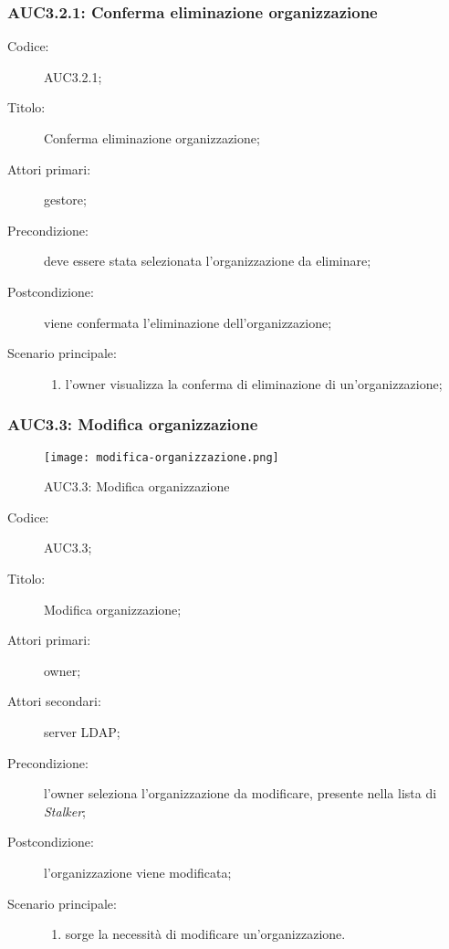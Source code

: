\documentclass[../../../analisi-dei-requisiti.tex]{subfiles}
\begin{document}
\subsubsection{AUC3.2.1: Conferma eliminazione organizzazione}%
\label{subs:AUC3.2.1}
\begin{description}
  \item[Codice:] AUC3.2.1;
  \item[Titolo:] Conferma eliminazione organizzazione;
  \item[Attori primari:] gestore;
  \item[Precondizione:] deve essere stata selezionata l'organizzazione da eliminare;
  \item[Postcondizione:] viene confermata l'eliminazione dell'organizzazione;
  \item[Scenario principale:]
        \begin{enumerate}
          \item l'owner visualizza la conferma di eliminazione di un'organizzazione;
        \end{enumerate}
\end{description}

\subsubsection{AUC3.3: Modifica organizzazione}%
\label{subs:AUC3.3}

\begin{figure}[H]
  \centering
  \texttt{[image: modifica-organizzazione.png]}
  \caption{AUC3.3: Modifica organizzazione}%
  \label{fig:AUC3_3}
\end{figure}

\begin{description}
  \item[Codice:] AUC3.3;
  \item[Titolo:] Modifica organizzazione;
  \item[Attori primari:] owner;
  \item[Attori secondari:] server LDAP\@;
  \item[Precondizione:] l'owner seleziona l'organizzazione da modificare, presente nella lista di \emph{Stalker};
  \item[Postcondizione:] l'organizzazione viene modificata;
  \item[Scenario principale:]
        \begin{enumerate}
          \item sorge la necessità di modificare un'organizzazione.
        \end{enumerate}
\end{description}
\end{document}
